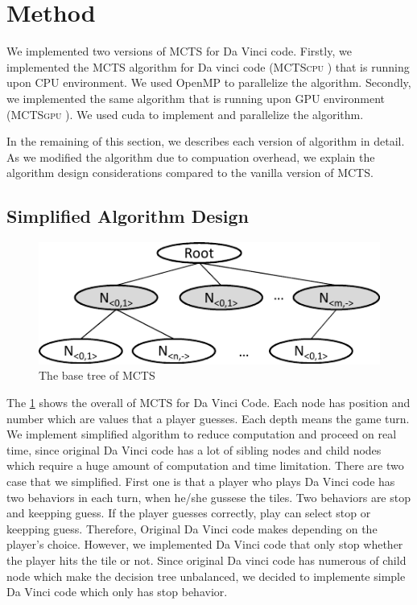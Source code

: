 \documentclass[conference]{IEEEtran}
\newcommand{\cpu} {\textsc{MCTScpu} }
\newcommand{\gpu} {\textsc{MCTSgpu} }
\begin{document}
\section{Method}
We implemented two versions of MCTS for Da Vinci code. 
Firstly, we implemented the MCTS algorithm for Da vinci code (\cpu) that is running upon CPU environment.
We used OpenMP to parallelize the algorithm.
Secondly, we implemented the same algorithm that is running upon GPU environment (\gpu).
We used cuda to implement and parallelize the algorithm.

In the remaining of this section, we describes each version of algorithm in detail. 
As we modified the algorithm due to compuation overhead, we explain the algorithm design considerations compared to the vanilla version of MCTS.

\subsection{Simplified Algorithm Design}

\begin{figure}
\includegraphics[width=0.95\columnwidth]{figures/base_tree.pdf}
\caption{The base tree of MCTS}
\label{fig:base_tree}
\end{figure}

 The \cref{fig:base_tree} shows the overall of MCTS for Da Vinci Code. 
 Each node has position and number which are values that a player guesses. Each depth means the game turn. 
 We implement simplified algorithm to reduce computation and proceed on real time, since original Da Vinci code has a lot of sibling nodes and child nodes which require a huge amount of computation and time limitation. 
 There are two case that we simplified. 
 First one is that a player who plays Da Vinci code has two behaviors in each turn, when he/she gussese the tiles. 
 Two behaviors are stop and keepping guess. 
 If the player guesses correctly, play can select stop or keepping guess. 
 Therefore, Original Da Vinci code makes depending on the player's choice. 
 However, we implemented Da Vinci code that only stop whether the player hits the tile or not. 
 Since original Da vinci code has numerous of child node which make the decision tree unbalanced, we decided to implemente simple Da Vinci code which only has stop behavior.
 
\end{document}
